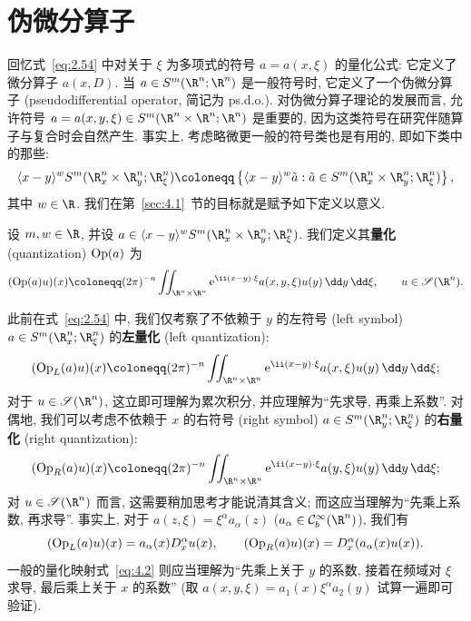 
\chapter{伪微分算子}\label{ch:04}

回忆式~\eqref{eq:2.54} 中对关于 $\xi$ 为多项式的符号 $a = a(x, \xi)$ 的量化公式: 它定义了微分算子 $a(x, D)$. 当 $a \in S^m(\R^n; \R^n)$ 是一般符号时, 它定义了一个伪微分算子 (pseudodifferential operator, 简记为 ps.d.o.). 对伪微分算子理论的发展而言, 允许符号 $a = a(x, y, \xi) \in S^m(\R^n \times \R^n; \R^n)$ 是重要的, 因为这类符号在研究伴随算子与复合时会自然产生. 事实上, 考虑略微更一般的符号类也是有用的, 即如下类中的那些:
\begin{equation}\label{eq:4.1}
    \langle x - y \rangle^w S^m(\R_x^n \times \R_y^n; \R_\xi^n) \defeq \left\{ \langle x - y \rangle^w \tilde{a} : \tilde{a} \in S^m(\R_x^n \times \R_y^n; \R_\xi^n) \right\},
\end{equation}
其中 $w \in \R$. 我们在第~\ref{sec:4.1}~节的目标就是赋予如下定义以意义.

\begin{definition}[量化映射]\label{def:4.1}
设 $m, w \in \R$, 并设 $a \in \langle x - y \rangle^w S^m(\R_x^n \times \R_y^n; \R_\xi^n)$. 我们定义其\textbf{量化} (quantization) $\operatorname{Op}(a)$ 为
\begin{equation}\label{eq:4.2}
    (\Op(a) u)(x) \defeq (2\pi)^{-n} \iint_{\R^n \times \R^n} \ee^{\ii (x-y) \cdot \xi} a(x, y, \xi) u(y) \,\dd y \,\dd\xi, \qquad u \in \Schwartz(\R^n).
\end{equation}
\end{definition}

此前在式~\eqref{eq:2.54} 中, 我们仅考察了不依赖于 $y$ 的左符号 (left symbol) $a \in S^m(\R_x^n; \R_\xi^n)$ 的\textbf{左量化} (left quantization):
\begin{equation}\label{eq:4.3}
    (\Op_L(a) u)(x) \defeq (2\pi)^{-n} \iint_{\R^n \times \R^n} \ee^{\ii (x-y) \cdot \xi} a(x, \xi) u(y) \,\dd y \,\dd\xi;
\end{equation}
对于 $u \in \Schwartz(\R^n)$, 这立即可理解为累次积分, 并应理解为``先求导, 再乘上系数''. 对偶地, 我们可以考虑不依赖于 $x$ 的右符号 (right symbol) $a \in S^m(\R_y^n; \R_\xi^n)$ 的\textbf{右量化} (right quantization):
\begin{equation}\label{eq:4.4}
    (\Op_R(a) u)(x) \defeq (2\pi)^{-n} \iint_{\R^n \times \R^n} \ee^{\ii (x-y) \cdot \xi} a(y, \xi) u(y) \,\dd y \,\dd\xi;
\end{equation}
对 $u \in \Schwartz(\R^n)$ 而言, 这需要稍加思考才能说清其含义; 而这应当理解为``先乘上系数, 再求导''. 事实上, 对于 $a(z, \xi) = \xi^\alpha a_\alpha(z)$ ($a_\alpha \in \mathcal{C}_b^\infty(\R^n)$), 我们有
\begin{equation}\label{eq:4.5}
    (\operatorname{Op}_L(a) u)(x) = a_\alpha(x) D_x^\alpha u(x), \qquad (\operatorname{Op}_R(a) u)(x) = D_x^\alpha(a_\alpha(x) u(x)).
\end{equation}
一般的量化映射式~\eqref{eq:4.2} 则应当理解为``先乘上关于 $y$ 的系数, 接着在频域对 $\xi$ 求导, 最后乘上关于 $x$ 的系数'' (取 $a(x, y, \xi) = a_1(x) \xi^\alpha a_2(y)$ 试算一遍即可验证).

